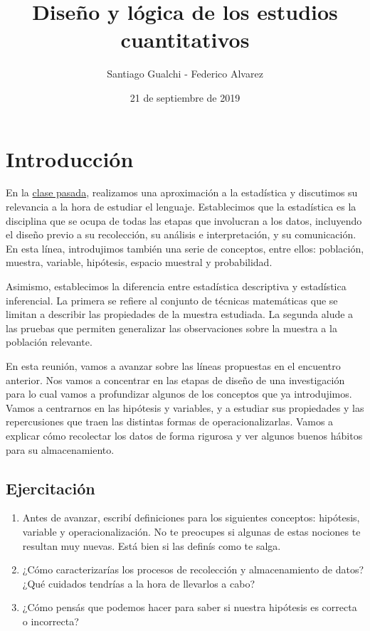 \documentclass[authoryear,a4paper, 14pt]{scrartcl}
\title{Diseño y lógica de los estudios cuantitativos}
\author{Santiago Gualchi - Federico Alvarez}
\date{21 de septiembre de 2019}
\begin{document}
    \maketitle


\hypertarget{introduccion}{%
\section{Introducción}\label{introduccion}}

En la
\href{https://drive.google.com/file/d/1vRmq8vyfwkgANQznM2oPuzhorcoIaSkZ/view?usp=sharing}{clase
pasada}, realizamos una aproximación a la estadística y discutimos su
relevancia a la hora de estudiar el lenguaje. Establecimos que la estadística es la disciplina que se ocupa
de todas las etapas que involucran a los datos, incluyendo el diseño
previo a su recolección, su análisis e interpretación, y su
comunicación. En esta línea, introdujimos también una serie de
conceptos, entre ellos: población, muestra, variable, hipótesis, espacio
muestral y probabilidad.

Asimismo, establecimos la diferencia entre estadística descriptiva y
estadística inferencial. La primera se refiere al conjunto de técnicas
matemáticas que se limitan a describir las propiedades de la muestra
estudiada. La segunda alude a las pruebas que permiten generalizar las
observaciones sobre la muestra a la población relevante.

En esta reunión, vamos a avanzar sobre las líneas propuestas en el
encuentro anterior. Nos vamos a concentrar en las etapas de diseño de
una investigación para lo cual vamos a profundizar algunos de los
conceptos que ya introdujimos. Vamos a centrarnos en las hipótesis y
variables, y a estudiar sus propiedades y las repercusiones que traen
las distintas formas de operacionalizarlas. Vamos a explicar cómo
recolectar los datos de forma rigurosa y ver algunos buenos hábitos
para su almacenamiento.

\hypertarget{ejercitacion}{%
\subsection{Ejercitación}\label{ejercitacion}}

\begin{enumerate}
    \item
      Antes de avanzar, escribí definiciones para los siguientes conceptos:
      hipótesis, variable y operacionalización. No te preocupes si algunas
      de estas nociones te resultan muy nuevas. Está bien si las definís
      como te salga.
    \item
      ¿Cómo caracterizarías los procesos de recolección y almacenamiento de
      datos? ¿Qué cuidados tendrías a la hora de llevarlos a cabo?
    \item
      ¿Cómo pensás que podemos hacer para saber si nuestra hipótesis es
      correcta o incorrecta?
\end{enumerate}
\end{document}
